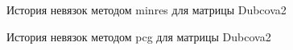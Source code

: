 \begin{figure}
    \renewcommand{\figurename}{Рисунок}
    \caption{История невязок методом minres для матрицы Dubcova2}
    \label{fig:image}
\end{figure}

\begin{figure}
    \renewcommand{\figurename}{Рисунок}
    \caption{История невязок методом pcg для матрицы Dubcova2}
    \label{fig:image}
\end{figure}

